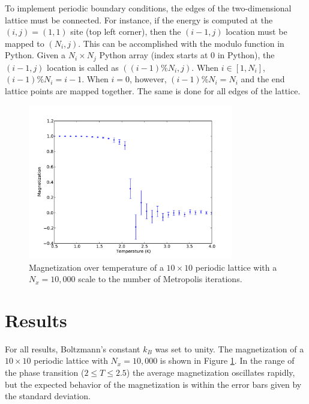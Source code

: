 \documentclass[12pt,oneside,a4paper]{article}
\begin{document}
To implement periodic boundary conditions, the edges of the two-dimensional lattice must be connected.  For instance, if the energy is computed at the $(i,j) = (1,1)$ site (top left corner), then the $(i-1, j)$ location must be mapped to $(N_i, j)$.  This can be accomplished with the modulo function in Python.  Given a $N_i \times N_j$ Python array (index starts at 0 in Python), the $(i-1, j)$ location is called as $( (i-1)\%N_i, j)$.  When $i \in \left[1, N_i\right]$, $(i-1)\%N_i = i-1$.  When $i=0$, however, $(i-1)\%N_i = N_i$ and the end lattice points are mapped together.  The same is done for all edges of the lattice.

\begin{figure}[!h]
	\centering
	\includegraphics[width=0.8\textwidth]{../results/magnetization_10x10_10k.pdf}
	\caption{Magnetization over temperature of a $10\times10$ periodic lattice with a $N_x=10,000$ scale to the number of Metropolis iterations.}
	\label{fig:mag10x10}
\end{figure}

\section{Results}

For all results, Boltzmann's constant $k_B$ was set to unity.  The magnetization of a $10\times10$ periodic lattice with $N_x = 10,000$ is shown in Figure \ref{fig:mag10x10}.  In the range of the phase transition ($2 \leq T \leq 2.5$) the average magnetization oscillates rapidly, but the expected behavior of the magnetization is within the error bars given by the standard deviation.  
\end{document}
